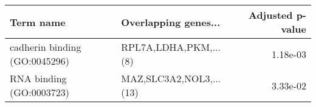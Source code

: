 \begin{tabular}{llr}
\toprule
                    Term name &    Overlapping genes... &  Adjusted p-value \\
\midrule
cadherin binding (GO:0045296) &   RPL7A,LDHA,PKM,...(8) &          1.18e-03 \\
     RNA binding (GO:0003723) & MAZ,SLC3A2,NOL3,...(13) &          3.33e-02 \\
\bottomrule
\end{tabular}
